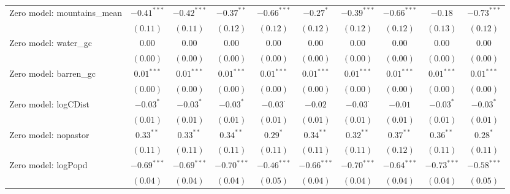 \begin{table}
\begin{center}
{\begin{tabular}{l c c c c c c c c c}
Zero model: mountains\_mean    & $-0.41^{***}$ & $-0.42^{***}$ & $-0.37^{**}$  & $-0.66^{***}$   & $-0.27^{*}$   & $-0.39^{***}$   & $-0.66^{***}$   & $-0.18$       & $-0.73^{***}$ \\
                               & $(0.11)$      & $(0.11)$      & $(0.12)$      & $(0.12)$        & $(0.12)$      & $(0.12)$        & $(0.12)$        & $(0.13)$      & $(0.12)$      \\
Zero model: water\_gc          & $0.00$        & $0.00$        & $0.00$        & $0.00$          & $0.00$        & $0.00$          & $0.00$          & $0.00$        & $0.00$        \\
                               & $(0.00)$      & $(0.00)$      & $(0.00)$      & $(0.00)$        & $(0.00)$      & $(0.00)$        & $(0.00)$        & $(0.00)$      & $(0.00)$      \\
Zero model: barren\_gc         & $0.01^{***}$  & $0.01^{***}$  & $0.01^{***}$  & $0.01^{***}$    & $0.01^{***}$  & $0.01^{***}$    & $0.01^{***}$    & $0.01^{***}$  & $0.01^{***}$  \\
                               & $(0.00)$      & $(0.00)$      & $(0.00)$      & $(0.00)$        & $(0.00)$      & $(0.00)$        & $(0.00)$        & $(0.00)$      & $(0.00)$      \\
Zero model: logCDist           & $-0.03^{*}$   & $-0.03^{*}$   & $-0.03^{*}$   & $-0.03^{\cdot}$ & $-0.02$       & $-0.03^{\cdot}$ & $-0.01$         & $-0.03^{*}$   & $-0.03^{*}$   \\
                               & $(0.01)$      & $(0.01)$      & $(0.01)$      & $(0.01)$        & $(0.01)$      & $(0.01)$        & $(0.01)$        & $(0.01)$      & $(0.01)$      \\
Zero model: nopastor           & $0.33^{**}$   & $0.33^{**}$   & $0.34^{**}$   & $0.29^{*}$      & $0.34^{**}$   & $0.32^{**}$     & $0.37^{**}$     & $0.36^{**}$   & $0.28^{*}$    \\
                               & $(0.11)$      & $(0.11)$      & $(0.11)$      & $(0.11)$        & $(0.11)$      & $(0.11)$        & $(0.12)$        & $(0.11)$      & $(0.11)$      \\
Zero model: logPopd            & $-0.69^{***}$ & $-0.69^{***}$ & $-0.70^{***}$ & $-0.46^{***}$   & $-0.66^{***}$ & $-0.70^{***}$   & $-0.64^{***}$   & $-0.73^{***}$ & $-0.58^{***}$ \\
                               & $(0.04)$      & $(0.04)$      & $(0.04)$      & $(0.05)$        & $(0.04)$      & $(0.04)$        & $(0.04)$        & $(0.04)$      & $(0.05)$      \\

\end{tabular}}
\end{center}
\end{table}
